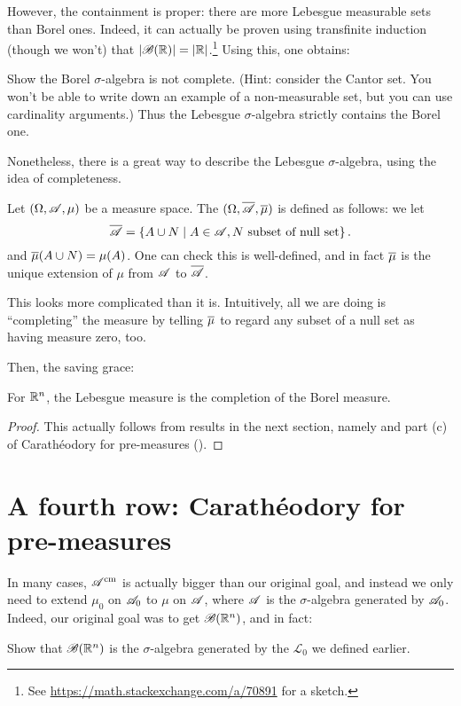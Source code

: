 However, the containment is proper:
there are more Lebesgue measurable sets than Borel ones.
Indeed, it can actually be proven using transfinite induction
(though we won't) that
$\left\lvert \mathscr B(\mathbb R) \right\rvert = \left\lvert \mathbb R \right\rvert$.\footnote{See
	\url{https://math.stackexchange.com/a/70891} for a sketch.}
Using this, one obtains:
\begin{exercise}
	Show the Borel $\sigma$-algebra is not complete.
	(Hint: consider the Cantor set.
	You won't be able to write down an example of a non-measurable
	set, but you can use cardinality arguments.)
	Thus the Lebesgue $\sigma$-algebra strictly contains the Borel one.
\end{exercise}

Nonetheless, there is a great way to describe the Lebesgue $\sigma$-algebra,
using the idea of completeness.
\begin{definition}
	Let $(\Omega, \mathscr A, \mu)$ be a measure space.
	The  $(\Omega, \overline{\mathscr A}, \overline{\mu})$
	is defined as follows:
	we let
	\[ \overline{\mathscr A} = \left\{ A \cup N \mid A \in \mathscr A,
		N \text{ subset of null set} \right\}. \]
	and $\overline{\mu}(A \cup N) = \mu(A)$.
	One can check this is well-defined,
	and in fact $\overline{\mu}$ is the unique extension
	of $\mu$ from $\mathscr A$ to $\overline{\mathscr A}$.

	This looks more complicated than it is.
	Intuitively, all we are doing is ``completing'' the measure
	by telling $\overline{\mu}$ to regard any subset of a null set
	as having measure zero, too.
\end{definition}

Then, the saving grace:
\begin{theorem}
	For $\mathbb R^n$, the Lebesgue measure is the completion of the Borel measure.
\end{theorem}
\begin{proof}
	This actually follows from results in the next section,
	namely 
	and part (c) of Carath\'{e}odory for pre-measures ().
\end{proof}

\section{A fourth row: Carath\'{e}odory for pre-measures}
In many cases, $\mathscr A^\text{cm}$ is actually bigger than our original goal,
and instead we only need to extend $\mu_0$ on $\mathscr A_0$
to $\mu$ on $\mathscr A$, where $\mathscr A$ is the $\sigma$-algebra generated by $\mathscr A_0$.
Indeed, our original goal was to get $\mathscr B(\mathbb R^n)$, and in fact:
\begin{exercise}
	Show that $\mathscr B(\mathbb R^n)$ is the $\sigma$-algebra generated
	by the $\mathcal{L}_0$ we defined earlier.
	\label{exer:cubes_vs_open}
\end{exercise}


